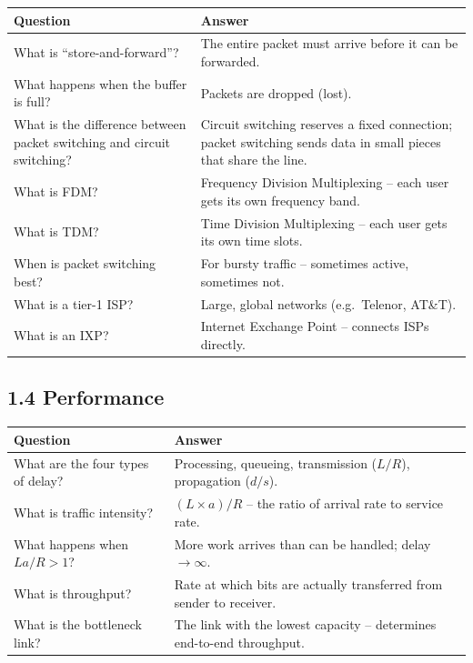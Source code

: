 \begin{exambox}
\begin{longtable}{p{6.5cm}p{7cm}}
\toprule
\textbf{Question} & \textbf{Answer} \\
\midrule
\endhead
What is ``store-and-forward''? & The entire packet must arrive before it can be forwarded. \\
\midrule
What happens when the buffer is full? & Packets are dropped (lost). \\
\midrule
What is the difference between packet switching and circuit switching? & Circuit switching reserves a fixed connection; packet switching sends data in small pieces that share the line. \\
\midrule
What is FDM? & Frequency Division Multiplexing -- each user gets its own frequency band. \\
\midrule
What is TDM? & Time Division Multiplexing -- each user gets its own time slots. \\
\midrule
When is packet switching best? & For bursty traffic -- sometimes active, sometimes not. \\
\midrule
What is a tier-1 ISP? & Large, global networks (e.g.\ Telenor, AT\&T). \\
\midrule
What is an IXP? & Internet Exchange Point -- connects ISPs directly. \\
\bottomrule
\end{longtable}
\end{exambox}

\subsection{1.4 Performance}

\begin{exambox}
\begin{longtable}{p{6.5cm}p{7cm}}
\toprule
\textbf{Question} & \textbf{Answer} \\
\midrule
\endhead
What are the four types of delay? & Processing, queueing, transmission ($L/R$), propagation ($d/s$). \\
\midrule
What is traffic intensity? & $(L \times a) / R$ -- the ratio of arrival rate to service rate. \\
\midrule
What happens when $La/R > 1$? & More work arrives than can be handled; delay $\to \infty$. \\
\midrule
What is throughput? & Rate at which bits are actually transferred from sender to receiver. \\
\midrule
What is the bottleneck link? & The link with the lowest capacity -- determines end-to-end throughput. \\
\bottomrule
\end{longtable}
\end{exambox}

